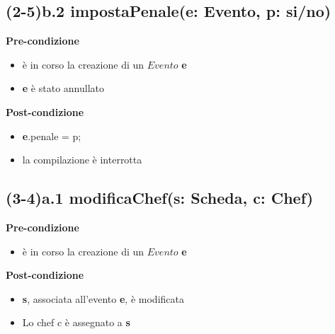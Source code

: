\documentclass[12pt]{extarticle}
\begin{document}
\subsection*{(2-5)b.2 impostaPenale(e: Evento, p: si/no)}
\textbf{Pre-condizione}
\begin{itemize}
  \item è in corso la creazione di un $Evento$ \textbf{e}
  \item \textbf{e} è stato annullato
\end{itemize}
\textbf{Post-condizione}
\begin{itemize}
  \item \textbf{e}.penale = p;
  \item la compilazione è interrotta
\end{itemize}  

\subsection*{(3-4)a.1 modificaChef(s: Scheda, c: Chef)}

\textbf{Pre-condizione}
\begin{itemize}
  \item è in corso la creazione di un $Evento$ \textbf{e}
\end{itemize} 
\textbf{Post-condizione}
\begin{itemize}
  \item \textbf{s}, associata all'evento \textbf{e}, è modificata
  \item Lo chef c è assegnato a \textbf{s}
\end{itemize} 
\end{document}
